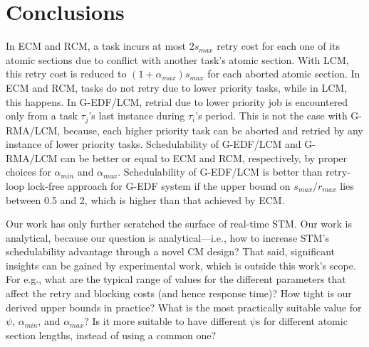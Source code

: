 \documentclass[conference]{IEEEtran}
\begin{document}
\section{Conclusions}
\label{sec:conclusions}

In ECM and RCM, a task incurs at most $2s_{max}$ retry cost for each one of its atomic sections due to conflict
with another task's atomic section. With LCM, this retry cost is reduced to $(1+\alpha_{max})s_{max}$ for each aborted atomic section. In ECM and RCM, tasks do not retry due to lower priority tasks, while in LCM, this happens. In G-EDF/LCM, retrial due to lower priority job is encountered only from a task $\tau_{j}$'s last instance during $\tau_{i}$'s period. This is not the case with G-RMA/LCM, because,  each higher priority task can be aborted and retried by any instance of lower priority tasks. Schedulability of G-EDF/LCM and G-RMA/LCM can be better or equal to ECM and RCM, respectively, by proper choices for $\alpha_{min}$ and $\alpha_{max}$. Schedulability of G-EDF/LCM is better than retry-loop lock-free approach for G-EDF system if the upper bound on $s_{max}/r_{max}$ lies between 0.5 and 2, which is higher than that achieved by ECM.

Our work has only further scratched the surface of real-time STM. Our work is analytical, because our question is analytical---i.e., how to increase STM's schedulability advantage through a novel CM design? That said, significant insights can be gained by experimental work, which is outside this work's  scope. For e.g., what are the typical range of values for the different parameters that affect the retry and blocking costs (and hence response time)? How tight is our derived upper bounds in practice? 
What is the most practically suitable
value for $\psi$, $\alpha_{min}$, and $\alpha_{max}$? Is it more suitable to have different $\psi$s for different atomic section lengths, instead of using a common one? 


%
%



\end{document}
